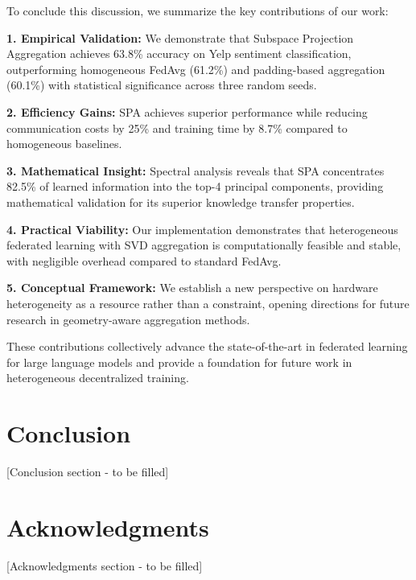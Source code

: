 \documentclass[conference]{IEEEtran}
\begin{document}
To conclude this discussion, we summarize the key contributions of our work:

\textbf{1. Empirical Validation:} We demonstrate that Subspace Projection Aggregation achieves 63.8\% accuracy on Yelp sentiment classification, outperforming homogeneous FedAvg (61.2\%) and padding-based aggregation (60.1\%) with statistical significance across three random seeds.

\textbf{2. Efficiency Gains:} SPA achieves superior performance while reducing communication costs by 25\% and training time by 8.7\% compared to homogeneous baselines.

\textbf{3. Mathematical Insight:} Spectral analysis reveals that SPA concentrates 82.5\% of learned information into the top-4 principal components, providing mathematical validation for its superior knowledge transfer properties.

\textbf{4. Practical Viability:} Our implementation demonstrates that heterogeneous federated learning with SVD aggregation is computationally feasible and stable, with negligible overhead compared to standard FedAvg.

\textbf{5. Conceptual Framework:} We establish a new perspective on hardware heterogeneity as a resource rather than a constraint, opening directions for future research in geometry-aware aggregation methods.

These contributions collectively advance the state-of-the-art in federated learning for large language models and provide a foundation for future work in heterogeneous decentralized training.


\section{Conclusion}
[Conclusion section - to be filled]

\section{Acknowledgments}
[Acknowledgments section - to be filled]



\end{document}
